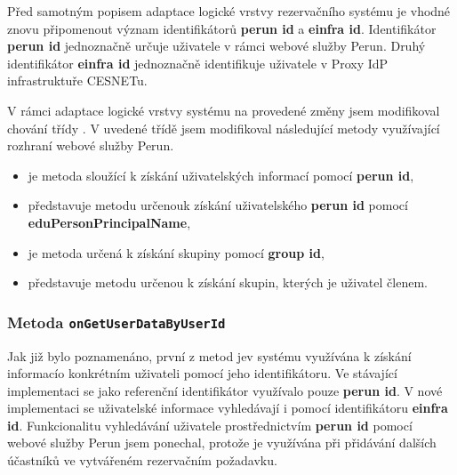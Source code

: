 \documentclass[
  printed, %
  twoside, %
  table,   %
  nolof,     %
  nolot,     %
]{fithesis3}
\begin{document}
\par
Před samotným popisem adaptace logické vrstvy rezervačního systému  je vhodné znovu připomenout význam identifikátorů \textbf{perun id} a \textbf{einfra id}. Identifikátor \textbf{perun id} jednoznačně určuje uživatele v rámci webové služby Perun. Druhý identifikátor \textbf{einfra id} jednoznačně identifikuje uživatele v Proxy IdP infrastruktuře CESNETu. 
\par V rámci adaptace logické vrstvy systému  na provedené změny jsem modifikoval chování třídy . V uvedené třídě jsem modifikoval následující metody využívající rozhraní webové služby Perun.
\begin{itemize}
    \item {} je metoda sloužící k získání uživatelských informací pomocí \textbf{perun id}, 
    \item {} představuje metodu určenou\break k získání uživatelského \textbf{perun id} pomocí \textbf{eduPersonPrincipalName},
    \item {} je metoda určená k získání skupiny pomocí \textbf{group id},
    \item {} představuje metodu určenou k získání skupin, kterých je uživatel členem. 
\end{itemize}



\subsubsection{Metoda \texttt{onGetUserDataByUserId}}

Jak již bylo poznamenáno, první z metod  je\break v systému  využívána k získání informací\break o konkrétním uživateli pomocí jeho identifikátoru. Ve stávající implementaci se jako referenční identifikátor využívalo pouze \textbf{perun id}. V nové implementaci se uživatelské informace vyhledávají i pomocí identifikátoru \textbf{einfra id}. Funkcionalitu vyhledávání uživatele prostřednictvím \textbf{perun id} pomocí webové služby Perun jsem ponechal, protože je využívána při přidávání dalších účastníků ve vytvářeném rezervačním požadavku. 

\par 
\end{document}
